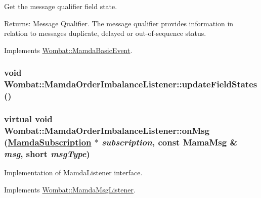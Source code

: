 Get the message qualifier field state. 

\begin{Desc}
\item[Returns:]Message Qualifier. The message qualifier provides information in relation to messages duplicate, delayed or out-of-sequence status. \end{Desc}


Implements \hyperlink{classWombat_1_1MamdaBasicEvent_3454d51e1131d9949691ee4b4153cd97}{Wombat::Mamda\-Basic\-Event}.\hypertarget{classWombat_1_1MamdaOrderImbalanceListener_4d482115146d7030c0550acf8f63b2b6}{
\subsubsection[updateFieldStates]{\setlength{\rightskip}{0pt plus 5cm}void Wombat::Mamda\-Order\-Imbalance\-Listener::update\-Field\-States ()}}
\label{classWombat_1_1MamdaOrderImbalanceListener_4d482115146d7030c0550acf8f63b2b6}


\hypertarget{classWombat_1_1MamdaOrderImbalanceListener_b2125b8a0df3f3c01fc9b2f3efa088ce}{
\subsubsection[onMsg]{\setlength{\rightskip}{0pt plus 5cm}virtual void Wombat::Mamda\-Order\-Imbalance\-Listener::on\-Msg (\hyperlink{classWombat_1_1MamdaSubscription}{Mamda\-Subscription} $\ast$ {\em subscription}, const Mama\-Msg \& {\em msg}, short {\em msg\-Type})}}
\label{classWombat_1_1MamdaOrderImbalanceListener_b2125b8a0df3f3c01fc9b2f3efa088ce}


Implementation of Mamda\-Listener interface. 



Implements \hyperlink{classWombat_1_1MamdaMsgListener_c700829ebcce095b95b8b67b39a1c67d}{Wombat::Mamda\-Msg\-Listener}.